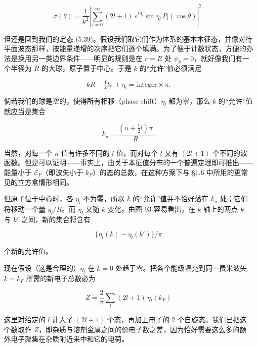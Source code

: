 \begin{equation*}
\sigma(\theta) = \frac{1}{k^2} \left| \sum_{l=0}^{\infty} (2l+1)\, e^{i\eta_l} \sin\eta_l \, P_l(\cos\theta) \right|^2 .
\tag{5.40}
\end{equation*}

但还是回到我们的定态 (5.39)。假设我们取它们作为体系的基本本征态，并像对待平面波态那样，按能量递增的次序把它们逐个填满。为了便于计数状态，方便的办法是换用另一类边界条件——明显的规则是在 $r = R$ 处 $\psi_k = 0$，就好像我们有一个半径为 $R$ 的大球，原子置于中心。于是 $k$ 的“允许”值必须满足

\begin{equation*}
kR - \tfrac{1}{2}l\pi + \eta_l = \text{integer} \times \pi .
\tag{5.41}
\end{equation*}

倘若我们的球是空的，使得所有相移（phase shift）$\eta_l$ 都为零，那么 $k$ 的“允许”值就应当是集合

\begin{equation*}
k_n = \frac{\left(n + \tfrac{1}{2}l\right)\pi}{R} .
\tag{5.42}
\end{equation*}

当然，对每一个 $n$ 值有许多不同的 $l$ 值，而对每个 $l$ 又有 $(2l+1)$ 个不同的波函数。但是可以证明——事实上，由关于本征值分布的一个普遍定理即可推出——能量小于 $\mathcal{E}_F$（即波矢小于 $k_F$）的态的总数，在这种方案下与 §1.6 中所用的更常见的立方盒情形相同。


但原子位于中心时，各 $\eta_l$ 不为零，所以 $k$ 的“允许”值并不恰好落在 $k_n$ 处；它们将移动一个量 $\eta_l/R$。而 $\eta_l$ 又随 $k$ 变化。由图 93 容易看出，在 $k$ 轴上的两点 $k$ 与 $k'$ 之间，新的集合将含有

\begin{equation*}
\{\eta_l(k) - \eta_l(k')\}/\pi
\end{equation*}

个新的允许值。

现在假设（这是合理的）$\eta_l$ 在 $k = 0$ 处趋于零。把各个能级填充到同一费米波矢 $k = k_F$ 所需的新电子总数必为

\begin{equation*}
Z = \frac{2}{\pi} \sum_l (2l+1)\, \eta_l(k_F)
\tag{5.43}
\end{equation*}

这里对给定的 $l$ 计入了 $(2l+1)$ 个态，再加上电子的 2 个自旋态。我们已把这个数取作 $Z$，即杂质与溶剂金属之间的价电子数之差，因为恰好需要这么多的额外电子聚集在杂质附近来中和它的电荷。

